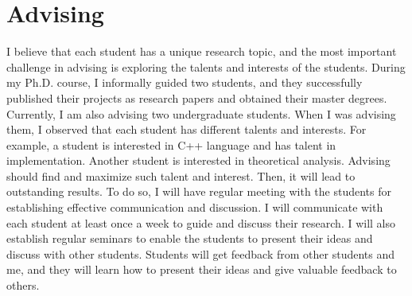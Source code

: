 \documentclass[11pt]{article}
\begin{document}
\section{Advising}
I believe that each student has a unique research topic, and the most important challenge in advising is exploring the talents and interests of the students.
During my Ph.D. course, I informally guided two students, and they successfully published their projects as research papers and obtained their master degrees. Currently, I am also advising two undergraduate students.
When I was advising them, I observed that each student has different talents and interests.
For example, a student is interested in C++ language and has talent in implementation. Another student is interested in theoretical analysis.
Advising should find and maximize such talent and interest. Then, it will lead to outstanding results.
To do so, I will have regular meeting with the students for establishing effective communication and discussion. 
I will communicate with each student at least once a week to guide and discuss their research.
I will also establish regular seminars to enable the students to present their ideas and discuss with other students.
Students will get feedback from other students and me, and they will learn how to present their ideas and give valuable feedback to others.
\end{document}
